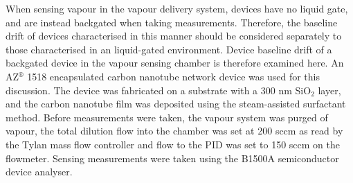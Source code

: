 \documentclass[
  a4paper,
]{scrbook}
\begin{document}
When sensing vapour in the vapour delivery system, devices have no
liquid gate, and are instead backgated when taking measurements.
Therefore, the baseline drift of devices characterised in this manner
should be considered separately to those characterised in an
liquid-gated environment. Device baseline drift of a backgated device in
the vapour sensing chamber is therefore examined here. An
AZ\(^\circledR\) 1518 encapsulated carbon nanotube network device was
used for this discussion. The device was fabricated on a substrate with
a 300 nm SiO\(_2\) layer, and the carbon nanotube film was deposited
using the steam-assisted surfactant method. Before measurements were
taken, the vapour system was purged of vapour, the total dilution flow
into the chamber was set at 200 sccm as read by the Tylan mass flow
controller and flow to the PID was set to 150 sccm on the flowmeter.
Sensing measurements were taken using the B1500A semiconductor device
analyser.
\end{document}
